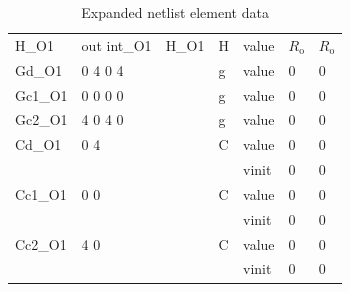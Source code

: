 \begin{table}[h]
\begin{tabular}[c]{lllllll}
\rowcolor{myyellow}
\small{H\_O1} &\small{out int\_O1 } &\small{H\_O1 } &\small{H} &\small{value} &$R_{\mathrm{o}}$ &$R_{\mathrm{o}}$ \\ 
\small{Gd\_O1} &\small{0 4 0 4 } & &\small{g} &\small{value} &$0$ &$0$ \\ 
\rowcolor{myyellow}
\small{Gc1\_O1} &\small{0 0 0 0 } & &\small{g} &\small{value} &$0$ &$0$ \\ 
\small{Gc2\_O1} &\small{4 0 4 0 } & &\small{g} &\small{value} &$0$ &$0$ \\ 
\rowcolor{myyellow}
\small{Cd\_O1} &\small{0 4 } & &\small{C} &\small{value} &$0$ &$0$ \\ 
 & & & &\small{vinit} &$0$ &$0$ \\ 
\rowcolor{myyellow}
\small{Cc1\_O1} &\small{0 0 } & &\small{C} &\small{value} &$0$ &$0$ \\ 
 & & & &\small{vinit} &$0$ &$0$ \\ 
\rowcolor{myyellow}
\small{Cc2\_O1} &\small{4 0 } & &\small{C} &\small{value} &$0$ &$0$ \\ 
 & & & &\small{vinit} &$0$ &$0$ \\ 
\end{tabular}
\caption{Expanded netlist element data}
\end{table}

